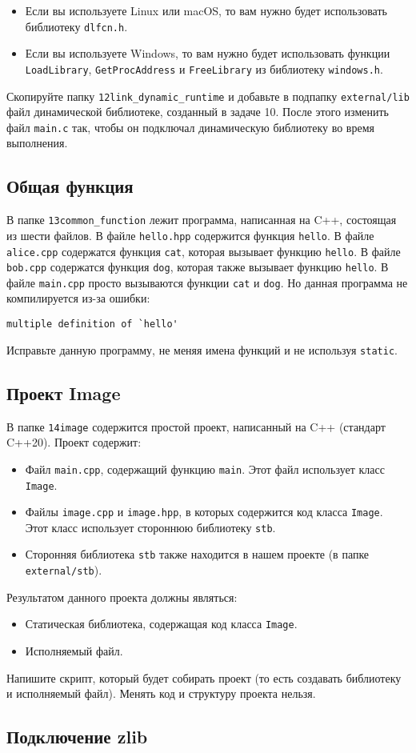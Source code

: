 \documentclass{article}
\begin{document}
\begin{itemize}
\item Если вы используете Linux или macOS, то вам нужно будет использовать библиотеку \texttt{dlfcn.h}.
\item Если вы используете Windows, то вам нужно будет использовать функции \texttt{LoadLibrary}, \texttt{GetProcAddress} и \texttt{FreeLibrary} из библиотеку \texttt{windows.h}.
\end{itemize}
Скопируйте папку \texttt{12link\_dynamic\_runtime} и добавьте в подпапку \texttt{external/lib} файл динамической библиотеке, созданный в задаче 10. После этого изменить файл \texttt{main.c} так, чтобы он подключал динамическую библиотеку во время выполнения.


\subsection{Общая функция}
В папке \texttt{13common\_function} лежит программа, написанная на C++, состоящая из шести файлов. В файле \texttt{hello.hpp} содержится функция \texttt{hello}. В файле \texttt{alice.cpp} содержатся функция \texttt{cat}, которая вызывает функцию \texttt{hello}. В файле \texttt{bob.cpp} содержатся функция \texttt{dog}, которая также вызывает функцию \texttt{hello}. В файле \texttt{main.cpp} просто вызываются функции \texttt{cat} и \texttt{dog}. Но данная программа не компилируется из-за ошибки:
\begin{lstlisting}[style=csMiptBash]
multiple definition of `hello'
\end{lstlisting}
Исправьте данную программу, не меняя имена функций и не используя \texttt{static}.



\subsection{Проект Image}
В папке \texttt{14image} содержится простой проект, написанный на C++ (стандарт C++20).
Проект содержит:
\begin{itemize}
\item Файл \texttt{main.cpp}, содержащий функцию \texttt{main}. Этот файл использует класс \texttt{Image}.
\item Файлы \texttt{image.cpp} и \texttt{image.hpp}, в которых содержится код класса \texttt{Image}.\\
Этот класс использует стороннюю библиотеку \texttt{stb}.
\item Сторонняя библиотека \texttt{stb} также находится в нашем проекте (в папке \texttt{external/stb}).
\end{itemize}
Результатом данного проекта должны являться:
\begin{itemize}
\item Статическая библиотека, содержащая код класса \texttt{Image}.
\item Исполняемый файл.
\end{itemize}
Напишите скрипт, который будет собирать проект (то есть создавать библиотеку и исполняемый файл). Менять код и структуру проекта нельзя.


\subsection{Подключение zlib}
\end{document}
